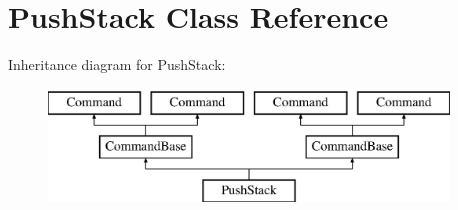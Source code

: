 \hypertarget{class_push_stack}{}\section{Push\+Stack Class Reference}
\label{class_push_stack}
Inheritance diagram for Push\+Stack\+:\begin{figure}[H]
\begin{center}
\leavevmode
\includegraphics[height=3.000000cm]{class_push_stack}
\end{center}
\end{figure}
